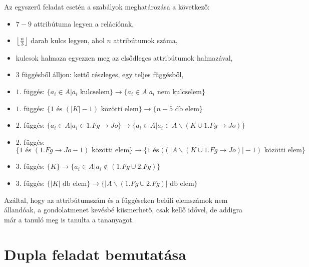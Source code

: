Az egyszerű feladat esetén a szabályok meghatározása a következő:
\begin{itemize}
    \item $7-9$ attribútuma legyen a relációnak,
    \item $\floor*{\frac{n}{3}}$ darab kulcs legyen, ahol $n$ attribútumok száma,
    \item kulcsok halmaza egyezzen meg az elsődleges attribútumok halmazával,
    \item $3$ függésből álljon: kettő részleges, egy teljes függésből,
    \item $1.$ függés: $\big\{ a_i \in A \big| a_i \text{ kulcselem}  \big\} \longrightarrow \big\{  a_i \in A \big| a_i \text{ nem kulcselem}  \big\}$ 
    \item $1. $ függés: $\big \{ 1 \text{ és } (|K|-1) \text{ közötti elem} \big\} \longrightarrow \big\{ n-5 \text{ db elem} \big \}$
    \item $2.$ függés: $\big\{ a_i \in A \big| a_i \in 1.Fg \rightarrow Jo  \big\} \longrightarrow \big\{  a_i \in A \big| a_i \in A \backslash (K \cup 1.Fg \rightarrow Jo)  \big\}$ 
    \item $2. $ függés: $\big \{ 1 \text{ és } (1.Fg\rightarrow Jo - 1) \text{ közötti elem} \big\} \longrightarrow \big\{ 1 \text { és } ( (|A \backslash (K \cup 1.Fg \rightarrow Jo)| - 1)  \text{ közötti elem} \big \}$
    \item $3.$ függés: $\big\{ K \big\} \longrightarrow \big\{  a_i \in A \big| a_i \not\in (1.Fg \cup 2.Fg)  \big\}$ 
    \item $3. $ függés: $\big \{ |K| \text{ db elem} \big\} \longrightarrow \big\{|A \backslash (1.Fg \cup 2.Fg)| \text{ db elem} \big \}$
\end{itemize}

Azáltal, hogy az attribútumszám és a függéseken belüli elemszámok nem állandóak, a gondolatmenet kevésbé kiismerhető, csak kellő idővel, de addigra már a tanuló meg is tanulta a tananyagot. 

\section{Dupla feladat bemutatása}

